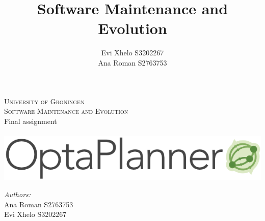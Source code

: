 \documentclass{article}
\title{Software Maintenance and Evolution}
\author{
    Evi Xhelo S3202267 \\
    Ana Roman S2763753 
        }
\begin{document}
\begin{titlepage}
\newcommand{\HRule}{\rule{\linewidth}{0.5mm}}
\center
\textsc{\Large University of Groningen \\
Software Maintenance and Evolution}\\[0.3cm]
{\large Final assignment}\\[1.5cm]
~
\centering
\includegraphics[scale=0.5]{figures/logo.png}\\[4cm]
\begin{minipage}{0.4\textwidth}
\centering
\emph{Authors:}\\
Ana Roman S2763753\\
Evi Xhelo S3202267
\end{minipage}\\[1.5cm]
\vfill
\end{titlepage}
% 
% 
% 
% 
% 
% 
% 
% 



\clearpage


\clearpage


\end{document}
